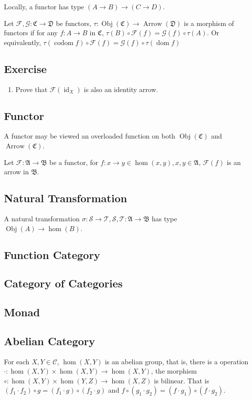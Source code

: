 \documentclass{article}
\newcommand{\id}{\mathop{\mathrm{id}}}
\newcommand{\dom}{\mathop{\mathrm{dom}}}
\newcommand{\codom}{\mathop{\mathrm{codom}}}
\newcommand{\obj}{\mathop{\mathrm{Obj}}}
\newcommand{\arrow}{\mathop{\mathrm{Arrow}}}
\begin{document}
Locally, a functor has type $(A \to B) \to (C \to D)$.

Let $\mathcal{F}, \mathcal{G} : \mathfrak{C} \to \mathfrak{D}$ be functors,
$\tau : \obj(\mathfrak{C}) \to \arrow(\mathfrak{D})$ is a morphism of functors if
for any $f : A \to B$ in $\mathfrak{C}$, $\tau(B) \circ \mathcal{F}(f) = \mathcal{G}(f) \circ \tau(A)$.
Or equivalently, $\tau(\codom f) \circ \mathcal{F}(f) = \mathcal{G}(f) \circ \tau(\dom f)$

\subsection*{Exercise}
\begin{enumerate}[1.]
\item Prove that $\mathcal{F}(\id_X)$ is also an identity arrow.
\end{enumerate}

\subsection{Functor}
A functor may be viewed an overloaded function on both $\obj(\mathfrak C)$ and
$\arrow(\mathfrak C)$.

Let $\mathcal F : \mathfrak A \to \mathfrak B$ be a functor,
for $f : x \to y \in \hom(x, y), x, y \in \mathfrak A$,
$\mathcal F(f)$ is an arrow in $\mathfrak B$.


\subsection{Natural Transformation}
A natural transformation
$\sigma : \mathcal S \to \mathcal T,
\mathcal S, \mathcal T : \mathfrak A \to \mathfrak B$ has type
$\obj(A) \to \hom(B)$.


\subsection{Function Category}

\subsection{Category of Categories}

\subsection{Monad}

\subsection{Abelian Category}
For each $X, Y \in \mathcal{C}$, $\hom(X, Y)$ is an abelian group,
that is, there is a operation $\cdot : \hom(X, Y) \times \hom(X, Y) \to \hom(X, Y)$,
the morphism $\circ : \hom(X, Y) \times \hom(Y, Z) \to \hom(X, Z)$ is bilinear.
That is $(f_1 \cdot f_2) \circ g = (f_1 \cdot g) \circ (f_2 \cdot g)$
and $f \circ (g_1 \cdot g_2) = (f \cdot g_1) \circ (f \cdot g_2)$.
\end{document}

